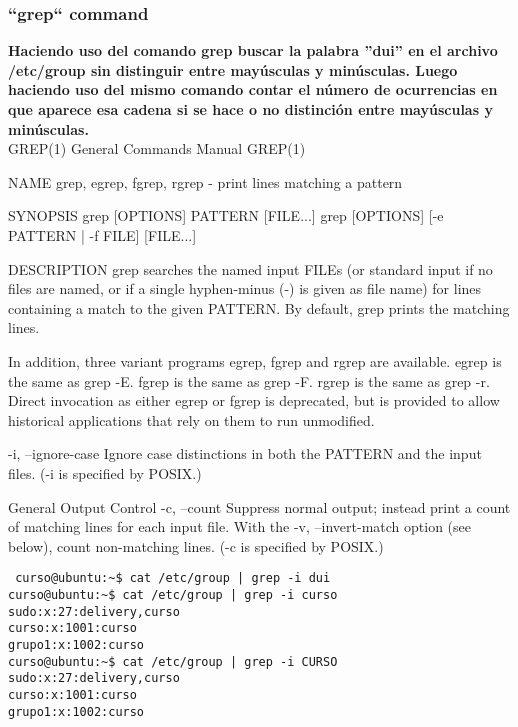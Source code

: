 \documentclass[a4paper,11pt,spanish]{article} %
\newenvironment{myscriptlisting}
{\begin{list}{}{\setlength{\leftmargin}{1em}}\item\scriptsize\bfseries}
{\end{list}}
\begin{document}
\subsubsection{``grep`` command}

\textbf{Haciendo uso del comando grep buscar la palabra ''dui'' en el archivo /etc/group 
sin distinguir entre mayúsculas y minúsculas. Luego haciendo uso del mismo comando contar 
el número de ocurrencias en que aparece esa cadena si se hace o no distinción entre mayúsculas
y minúsculas.}\\


GREP(1)                                                            General Commands Manual                                                           GREP(1)

NAME
       grep, egrep, fgrep, rgrep - print lines matching a pattern

SYNOPSIS
       grep [OPTIONS] PATTERN [FILE...]
       grep [OPTIONS] [-e PATTERN | -f FILE] [FILE...]

DESCRIPTION
       grep  searches  the  named  input  FILEs  (or  standard input if no files are named, or if a single hyphen-minus (-) is given as file name) for lines
       containing a match to the given PATTERN.  By default, grep prints the matching lines.

       In addition, three variant programs egrep, fgrep and rgrep are available.  egrep is the same as grep -E.  fgrep is the same as grep -F.  rgrep is the
       same as grep -r.  Direct invocation as either egrep or fgrep is deprecated, but is provided to allow historical applications that rely on them to run
       unmodified.

       -i, --ignore-case
              Ignore case distinctions in both the PATTERN and the input files.  (-i is specified by POSIX.)

       General Output Control
       -c, --count
              Suppress  normal  output;  instead print a count of matching lines for each input file.  With the -v, --invert-match option (see below), count
              non-matching lines.  (-c is specified by POSIX.)


\begin{myscriptlisting}
 \begin{verbatim}
 curso@ubuntu:~$ cat /etc/group | grep -i dui
curso@ubuntu:~$ cat /etc/group | grep -i curso
sudo:x:27:delivery,curso
curso:x:1001:curso
grupo1:x:1002:curso
curso@ubuntu:~$ cat /etc/group | grep -i CURSO
sudo:x:27:delivery,curso
curso:x:1001:curso
grupo1:x:1002:curso
 \end{verbatim}
\end{myscriptlisting}
\end{document}
